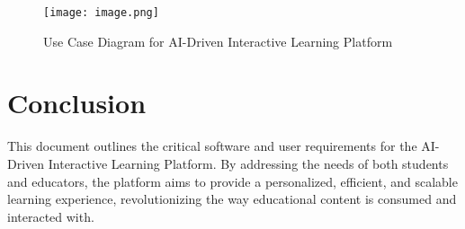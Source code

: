 \documentclass{article}
\begin{document}
\begin{figure}[h!]
\centering
\texttt{[image: image.png]}
\caption{Use Case Diagram for AI-Driven Interactive Learning Platform}
\end{figure}

\section{Conclusion}
This document outlines the critical software and user requirements for the AI-Driven Interactive Learning Platform. By addressing the needs of both students and educators, the platform aims to provide a personalized, efficient, and scalable learning experience, revolutionizing the way educational content is consumed and interacted with.
\end{document}
